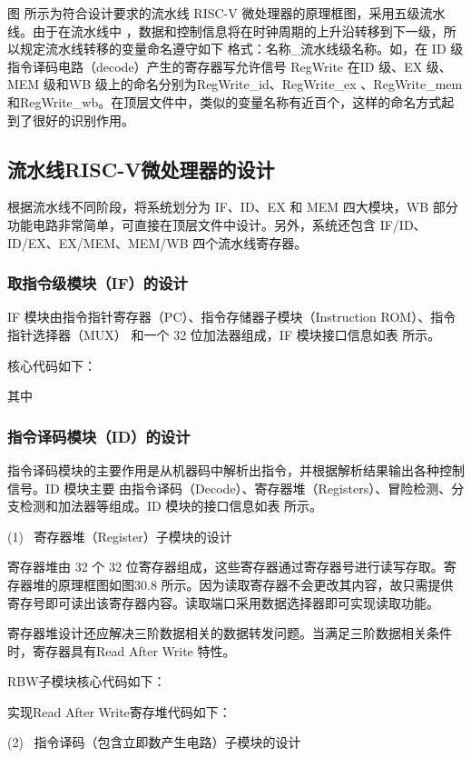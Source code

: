 \documentclass{../source/Experiment}
\begin{document}
        图  所示为符合设计要求的流水线 RISC-V 微处理器的原理框图，采用五级流水线。由于在流水线中 ，数据和控制信息将在时钟周期的上升沿转移到下一级，所以规定流水线转移的变量命名遵守如下 格式：名称\_流水线级名称。如，在 ID 级指令译码电路（decode）产生的寄存器写允许信号 RegWrite 在ID 级、EX 级、MEM 级和WB 级上的命名分别为RegWrite\_id、RegWrite\_ex 、RegWrite\_mem 和RegWrite\_wb。在顶层文件中，类似的变量名称有近百个，这样的命名方式起到了很好的识别作用。

        \subsection{流水线RISC-V微处理器的设计}
        根据流水线不同阶段，将系统划分为 IF、ID、EX 和 MEM 四大模块，WB 部分功能电路非常简单，可直接在顶层文件中设计。另外，系统还包含 IF/ID、ID/EX、EX/MEM、MEM/WB 四个流水线寄存器。
        \subsubsection{取指令级模块（IF）的设计}
        IF 模块由指令指针寄存器（PC）、指令存储器子模块（Instruction ROM）、指令指针选择器（MUX）
        和一个 32 位加法器组成，IF 模块接口信息如表  所示。

        核心代码如下：

        其中
        
        \subsubsection{指令译码模块（ID）的设计}
        指令译码模块的主要作用是从机器码中解析出指令，并根据解析结果输出各种控制信号。ID 模块主要
        由指令译码（Decode）、寄存器堆（Registers）、冒险检测、分支检测和加法器等组成。ID 模块的接口信息如表  所示。
        
        (1) \, 寄存器堆（Register）子模块的设计

        寄存器堆由 32 个 32 位寄存器组成，这些寄存器通过寄存器号进行读写存取。寄存器堆的原理框图如图30.8 所示。因为读取寄存器不会更改其内容，故只需提供寄存号即可读出该寄存器内容。读取端口采用数据选择器即可实现读取功能。

        寄存器堆设计还应解决三阶数据相关的数据转发问题。当满足三阶数据相关条件时，寄存器具有Read After Write 特性。

        RBW子模块核心代码如下：

        实现Read After Write寄存堆代码如下：

        (2) \, 指令译码（包含立即数产生电路）子模块的设计
\end{document}
